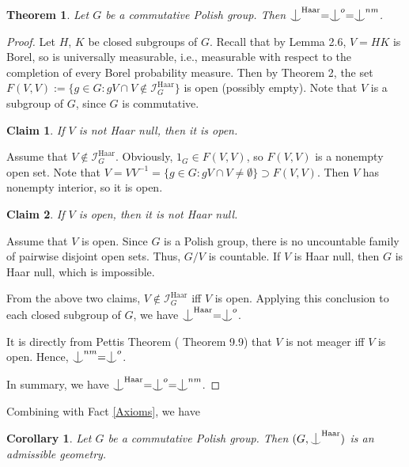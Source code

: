 \documentclass{article}
\newtheorem{theorem}[definition]{Theorem}
\newtheorem{coro}[definition]{Corollary}
\newtheorem*{claim}{Claim}
\newenvironment{claimproof}[1][\proofname]
               {
                 \proof[#1]
                 \renewcommand*\qedsymbol{$\square$\rlap{\textsubscript{Claim}}}
               }
               {
                 \endproof
               }
\newcommand{\I}{\mathcal{I}}
\newcommand{\HH}{\mathrm{Haar}}
\newcommand{\ind}{\mathrel{\raise0.2ex\hbox{\ooalign{\hidewidth$\vert$\hidewidth\cr\raise-0.9ex\hbox{$\smile$}}}}}
\begin{document}
\begin{theorem}
Let $G$ be a commutative Polish group. Then $\ind^\HH=\ind^o=\ind^{nm}$.
\end{theorem}
\begin{proof}
Let $H$, $K$ be closed subgroups of $G$.  Recall that by \cite{KP} Lemma 2.6, $V=HK$ is Borel, so is universally measurable, i.e., measurable with respect to the completion of every Borel probability measure. Then by \cite{C-Haar} Theorem 2, the set $F(V,V):=\{g\in G: gV\cap V\notin \I^\HH_G\}$ is open (possibly empty). Note that $V$ is a subgroup of $G$, since $G$ is commutative.

\begin{claim}
If $V$ is not Haar null, then it is open.
\end{claim}
\begin{claimproof}
Assume that $V\notin \I^\HH_G$.
Obviously, $1_G\in F(V,V)$, so $F(V,V)$ is a nonempty open set. Note that $V=VV^{-1}=\{g\in G: gV\cap V\neq \emptyset\}\supset F(V,V)$. Then $V$ has nonempty interior, so it is open.
\end{claimproof}

\begin{claim}
If $V$ is open, then it is not Haar null.
\end{claim}
\begin{claimproof}
Assume that $V$ is open.
Since $G$ is a Polish group, there is no uncountable family of pairwise disjoint open sets. Thus, $G/V$ is countable. If $V$ is Haar null, then $G$ is Haar null, which is impossible.
\end{claimproof}

From the above two claims, $V\notin \I_G^\HH$ iff $V$ is open. Applying this conclusion to each closed subgroup of $G$, we have $\ind^\HH=\ind^o$.

It is directly from Pettis Theorem (\cite{K-Book} Theorem 9.9) that $V$ is not meager iff $V$ is open. Hence, $\ind^{nm}=\ind^o$.

In summary, we have $\ind^\HH=\ind^o=\ind^{nm}$.
\end{proof}

Combining with Fact \ref{Axioms}, we have
\begin{coro}
Let $G$ be a commutative Polish group. Then $(G,\ind^\HH)$ is an admissible geometry.
\end{coro}
\end{document}
